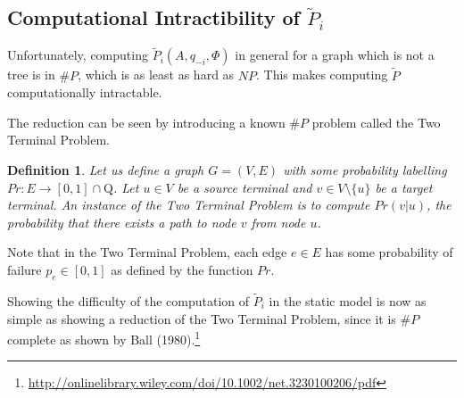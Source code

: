\documentclass{article}
\theoremstyle{plain}
\newtheorem{definition}{Definition}
\begin{document}
\subsection{Computational Intractibility of $\tilde{P}_i$}

Unfortunately, computing $\tilde{P}_i(A, q_{-i}, \Phi)$ in general for a graph which is not a tree is in $\# P$, which is as least as hard as $NP$. This makes computing $\tilde{P}$ computationally intractable.

The reduction can be seen by introducing a known $\# P$ problem called the Two Terminal Problem.

\begin{definition}
  Let us define a graph $G = (V, E)$ with some probability labelling $Pr: E \to [0,1] \cap \mathrm{Q}$. Let $u \in V$ be a source terminal and $v \in V \setminus \{u\}$ be a target terminal. An instance of the \emph{Two Terminal Problem} is to compute $Pr(v | u)$, the probability that there exists a path to node $v$ from node $u$.
\end{definition}

Note that in the Two Terminal Problem, each edge $e \in E$ has some probability of failure $p_e \in [0,1]$ as defined by the function $Pr$.

Showing the difficulty of the computation of $\tilde{P}_i$ in the static model is now as simple as showing a reduction of the Two Terminal Problem, since it is $\# P$ complete as shown by Ball (1980).\footnote{\url{http://onlinelibrary.wiley.com/doi/10.1002/net.3230100206/pdf}}
\end{document}

